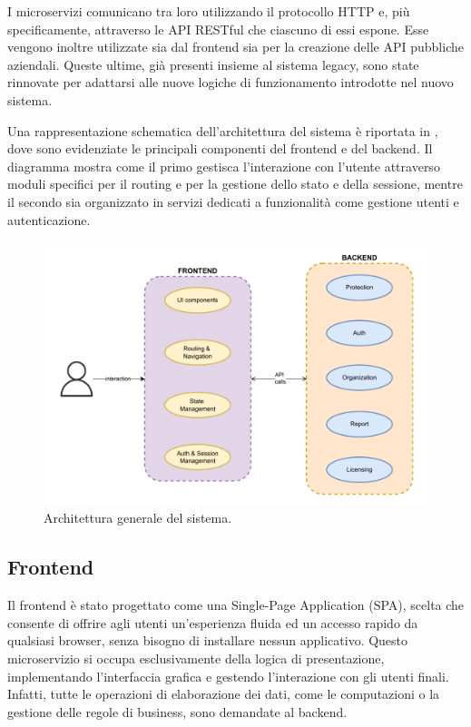 I microservizi comunicano tra loro utilizzando il protocollo HTTP e, più specificamente, attraverso le API RESTful che ciascuno di essi espone. Esse vengono inoltre utilizzate sia dal frontend sia per la creazione delle API pubbliche aziendali. Queste ultime, già presenti insieme al sistema legacy, sono state rinnovate per adattarsi alle nuove logiche di funzionamento introdotte nel nuovo sistema.

Una rappresentazione schematica dell'architettura del sistema è riportata in , dove sono evidenziate le principali componenti del frontend e del backend. Il diagramma mostra come il primo gestisca l'interazione con l'utente attraverso moduli specifici per il routing e per la gestione dello stato e della sessione, mentre il secondo sia organizzato in servizi dedicati a funzionalità come gestione utenti e autenticazione.

\begin{figure}
  \centering
  \includegraphics[width=1.0\textwidth]{figures/system-architecture.pdf}
  \caption{Architettura generale del sistema.}
  \label{fig:system-architecture}
\end{figure}

\subsection{Frontend}
Il frontend è stato progettato come una Single-Page Application (SPA), scelta che consente di offrire agli utenti un'esperienza fluida ed un accesso rapido da qualsiasi browser, senza bisogno di installare nessun applicativo. Questo microservizio si occupa esclusivamente della logica di presentazione, implementando l'interfaccia grafica e gestendo l'interazione con gli utenti finali. Infatti, tutte le operazioni di elaborazione dei dati, come le computazioni o la gestione delle regole di business, sono demandate al backend.

